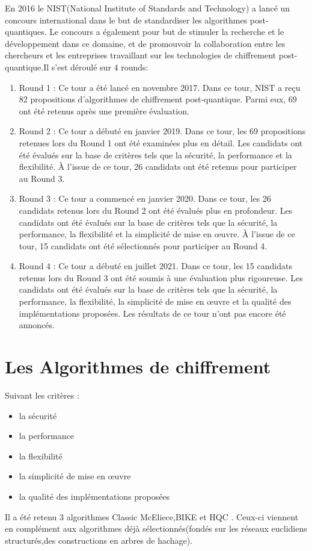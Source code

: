 \documentclass[12pt,openany]{report}
\begin{document}
En 2016 le NIST(National Institute of Standards and Technology) a lancé un concours international dans le but de standardiser les algorithmes post-quantiques. Le concours a également pour but de stimuler la recherche et le développement dans ce domaine, et de promouvoir la collaboration entre les chercheurs et les entreprises travaillant sur les technologies de chiffrement post-quantique.Il s'est déroulé sur 4 rounds: 
\begin{enumerate}
\item Round 1 : Ce tour a été lancé en novembre 2017. Dans ce tour, NIST a reçu 82 propositions d'algorithmes de chiffrement post-quantique. Parmi eux, 69 ont été retenus après une première évaluation.
\item Round 2 : Ce tour a débuté en janvier 2019. Dans ce tour, les 69 propositions retenues lors du Round 1 ont été examinées plus en détail. Les candidats ont été évalués sur la base de critères tels que la sécurité, la performance et la flexibilité. À l'issue de ce tour, 26 candidats ont été retenus pour participer au Round 3.
\item Round 3 : Ce tour a commencé en janvier 2020. Dans ce tour, les 26 candidats retenus lors du Round 2 ont été évalués plus en profondeur. Les candidats ont été évalués sur la base de critères tels que la sécurité, la performance, la flexibilité et la simplicité de mise en œuvre. À l'issue de ce tour, 15 candidats ont été sélectionnés pour participer au Round 4.
\item Round 4 : Ce tour a débuté en juillet 2021. Dans ce tour, les 15 candidats retenus lors du Round 3 ont été soumis à une évaluation plus rigoureuse. Les candidats ont été évalués sur la base de critères tels que la sécurité, la performance, la flexibilité, la simplicité de mise en œuvre et la qualité des implémentations proposées. Les résultats de ce tour n'ont pas encore été annoncés.
\end{enumerate}

 
\section{Les Algorithmes de chiffrement}
 Suivant les critères :
\begin{itemize}
\item la sécurité
\item la performance
\item la flexibilité
\item la simplicité de mise en œuvre
\item la qualité des implémentations proposées
\end{itemize}
Il a été retenu 3 algorithmes Classic McEliece,\hspace{0.2cm}BIKE et HQC . Ceux-ci viennent en complément aux algorithmes déjà sélectionnés(fondés sur les réseaux euclidiens structurés,\hspace{0.2cm}des constructions en arbres de hachage).\\
\end{document}

